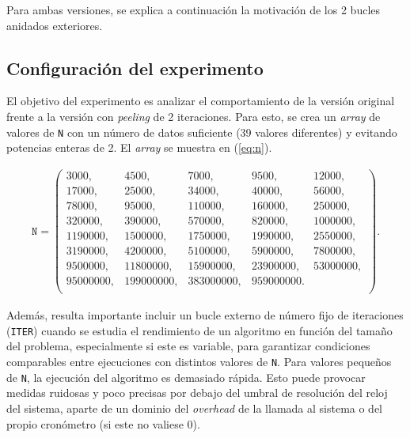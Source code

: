 \documentclass[11pt,a4paper,twoside]{article}
\theoremstyle{definition}
\begin{document}
	Para ambas versiones, se explica a continuación la motivación de los 2 bucles anidados exteriores.
	
	\subsection{Configuración del experimento}
	
	El objetivo del experimento es analizar el comportamiento de la versión original frente a la versión con \textit{peeling} de 2 iteraciones. Para esto, se crea un \textit{array} de valores de \texttt{N} con un número de datos suficiente (39 valores diferentes) y evitando potencias enteras de 2. El \textit{array} se muestra en (\ref{eq:n}).
	
	\begin{equation}\label{eq:n}
		\begin{aligned}
			\texttt{N} = \left(
			\begin{matrix}
				3000,      & 4500,      & 7000,      & 9500,      & 12000,		\\
				17000,     & 25000,     & 34000,     & 40000,     & 56000,		\\
				78000,     & 95000,     & 110000,    & 160000,    & 250000,		\\
				320000,    & 390000,    & 570000,    & 820000,    & 1000000,	\\
				1190000,   & 1500000,   & 1750000,   & 1990000,   & 2550000,	\\ 
				3190000,   & 4200000,   & 5100000,   & 5900000,   & 7800000,	\\
				9500000,   & 11800000,  & 15900000,  & 23900000,  & 53000000,	\\
				95000000,  & 199000000, & 383000000, & 959000000. &	\\
			\end{matrix}
			\right).
		\end{aligned}
	\end{equation}

	Además, resulta importante incluir un bucle externo de número fijo de iteraciones (\texttt{ITER}) cuando se estudia el rendimiento de un algoritmo en función del tamaño del problema, especialmente si este es variable, para garantizar condiciones comparables entre ejecuciones con distintos valores de \texttt{N}. Para valores pequeños de \texttt{N}, la ejecución del algoritmo es demasiado rápida. Esto puede provocar medidas ruidosas y poco precisas por debajo del umbral de resolución del reloj del sistema, aparte de un dominio del \textit{overhead} de la llamada al sistema o del propio cronómetro (si este no valiese 0).
	
\end{document}
